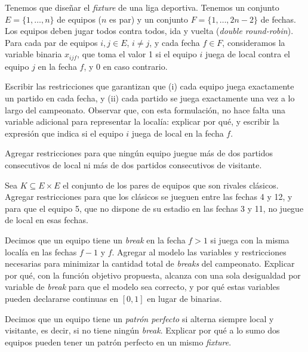 \documentclass[11pt,a4paper]{article}
\begin{document}
\newpage
Tenemos que diseñar el \emph{fixture} de una liga deportiva. Tenemos un conjunto
$E = \{1,\dots,n\}$ de equipos ($n$ es par) y un conjunto
$F = \{1,\dots,2n-2\}$ de fechas. Los equipos deben jugar todos contra todos,
ida y vuelta (\emph{double round-robin}). Para cada par de equipos
$i,j \in E$, $i \ne j$, y cada fecha $f \in F$, consideramos la variable binaria
$x_{ijf}$, que toma el valor 1 si el equipo $i$ juega de local contra el equipo
$j$ en la fecha $f$, y 0 en caso contrario.

\begin{puntos}
  \item Escribir las restricciones que garantizan que (i) cada equipo juega
  exactamente un partido en cada fecha, y (ii) cada partido se juega exactamente
  una vez a lo largo del campeonato. Observar que, con esta formulación, no hace
  falta una variable adicional para representar la localía: explicar por qué, y
  escribir la expresión que indica si el equipo $i$ juega de local en la fecha
  $f$.

  \item Agregar restricciones para que ningún equipo juegue más de dos partidos
  consecutivos de local ni más de dos partidos consecutivos de visitante.

  \item Sea $K \subseteq E \times E$ el conjunto de los pares de equipos que son
  rivales clásicos. Agregar restricciones para que los clásicos se jueguen entre
  las fechas 4 y 12, y para que el equipo 5, que no dispone de su estadio en las
  fechas 3 y 11, no juegue de local en esas fechas.

  \item Decimos que un equipo tiene un \emph{break} en la fecha $f > 1$ si juega
  con la misma localía en las fechas $f-1$ y $f$. Agregar al modelo las
  variables y restricciones necesarias para minimizar la cantidad total de
  \emph{breaks} del campeonato. Explicar por qué, con la función objetivo
  propuesta, alcanza con una sola desigualdad por variable de \emph{break} para
  que el modelo sea correcto, y por qué estas variables pueden declararse
  continuas en $[0,1]$ en lugar de binarias.

  \item Decimos que un equipo tiene un \emph{patrón perfecto} si alterna siempre
  local y visitante, es decir, si no tiene ningún \emph{break}. Explicar por qué
  a lo sumo dos equipos pueden tener un patrón perfecto en un mismo
  \emph{fixture}.
\end{puntos}
\end{document}
